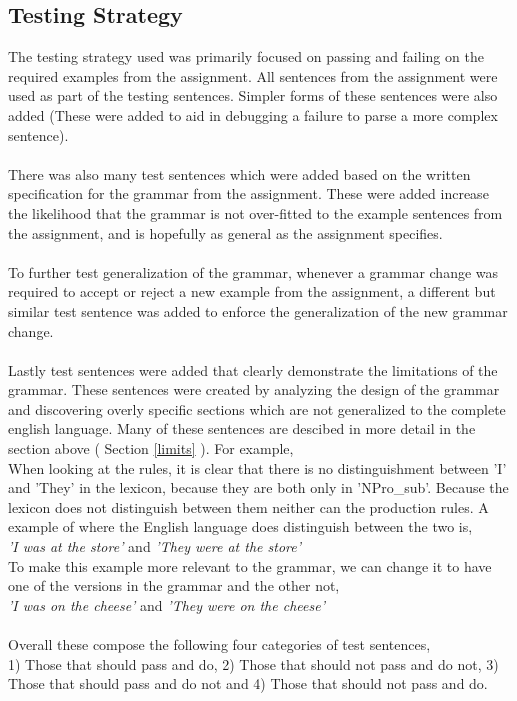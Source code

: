 \documentclass{article}
\begin{document}
\subsection{Testing Strategy}
The testing strategy used was primarily focused on passing and failing on the required examples from the assignment. All sentences from the assignment were used as part of the testing sentences. Simpler forms of these sentences were also added (These were added to aid in debugging a failure to parse a more complex sentence). \\ \\There was also many test sentences which were added based on the written specification for the grammar from the assignment. These were added increase the likelihood that the grammar is not over-fitted to the example sentences from the assignment, and is hopefully as general as the assignment specifies. 
\\ \\ 
To further test generalization of the grammar, whenever a grammar change was required to accept or reject a new example from the assignment, a different but similar test sentence was added to enforce the generalization of the new grammar change.
\\ \\ 
Lastly test sentences were added that clearly demonstrate the limitations of the grammar. These sentences were created by analyzing the design of the grammar and discovering overly specific sections which are not generalized to the complete english language. Many of these sentences are descibed in more detail in the section above ( Section \ref{limits} ). For example,\\
When looking at the rules, it is clear that there is no distinguishment between 'I' and 'They' in the lexicon, because they are both only in 'NPro\_sub'. Because the lexicon does not distinguish between them neither can the production rules. A example of where the English language does distinguish between the two is,\\
\textit{'I was at the store'} and \textit{'They were at the store'}\\
To make this example more relevant to the grammar, we can change it to have one of the versions in the grammar and the other not, \\
\textit{'I was on the cheese'} and \textit{'They were on the cheese'}
\\ \\
Overall these compose the following four categories of test sentences,\\
1) Those that should pass and do, 2) Those that should not pass and do not, 3) Those that should pass and do not and 4) Those that should not pass and do. \\ \\
\end{document}
